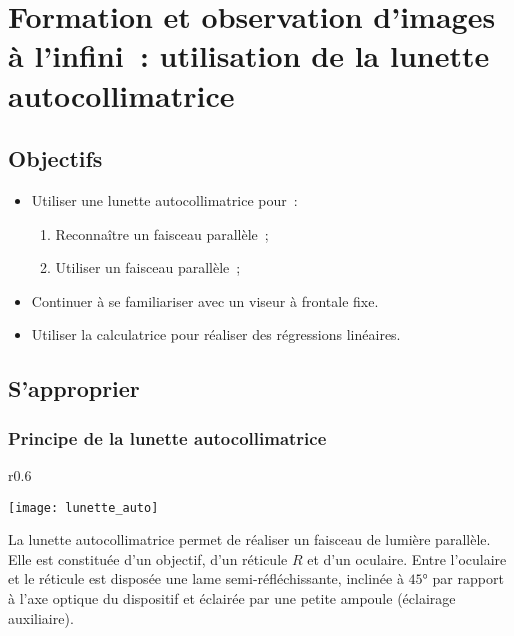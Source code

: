 \documentclass[a4paper, 12pt, final, garamond]{book}
\begin{document}
\setcounter{chapter}{2}

\chapter{Formation et observation d'images \`a l'infini~: utilisation de la
lunette autocollimatrice}

\section{Objectifs}

\begin{itemize}
    \item Utiliser une lunette autocollimatrice pour~:
        \begin{enumerate}
            \item Reconnaître un faisceau parallèle~;
            \item Utiliser un faisceau parallèle~;
        \end{enumerate}
    \item Continuer à se familiariser avec un viseur à frontale fixe. 
    \item Utiliser la calculatrice pour réaliser des régressions linéaires.
\end{itemize}

\section{S'approprier}

\subsection{Principe de la lunette autocollimatrice}

\begin{wrapfigure}[9]{r}{0.6\textwidth} 
    \vspace{-60pt}
    \begin{center}
        \texttt{[image: lunette\_auto]}
    \end{center}
    \vspace{-80pt}
\end{wrapfigure} 

La lunette autocollimatrice permet de réaliser un faisceau de lumière parallèle.
Elle est constituée d'un objectif, d'un réticule $R$ et d'un oculaire. Entre
l'oculaire et le réticule est disposée une lame semi-réfléchissante, inclinée à
$45°$ par rapport à l'axe optique du dispositif et éclairée par une petite
ampoule (éclairage auxiliaire).
\end{document}
